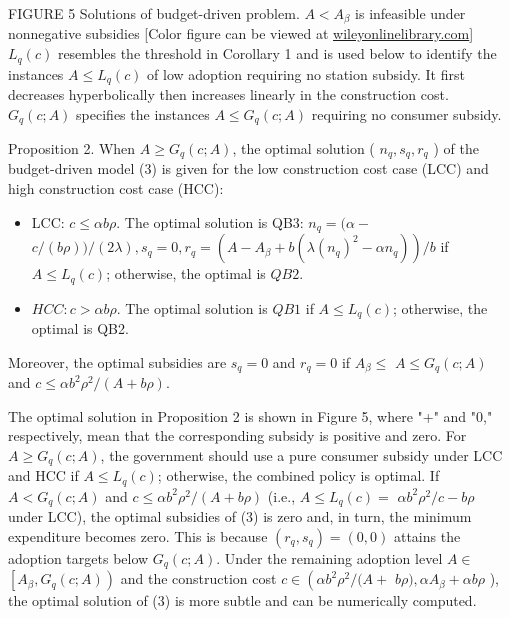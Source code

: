\documentclass[10pt]{article}
\begin{document}
FIGURE 5 Solutions of budget-driven problem. $A<A_{\beta}$ is infeasible under nonnegative subsidies [Color figure can be viewed at \href{http://wileyonlinelibrary.com}{wileyonlinelibrary.com}]\\
$L_{q}(c)$ resembles the threshold in Corollary 1 and is used below to identify the instances $A \leq L_{q}(c)$ of low adoption requiring no station subsidy. It first decreases hyperbolically then increases linearly in the construction cost. $G_{q}(c ; A)$ specifies the instances $A \leq G_{q}(c ; A)$ requiring no consumer subsidy.

Proposition 2. When $A \geq G_{q}(c ; A)$, the optimal solution ( $n_{q}, s_{q}, r_{q}$ ) of the budget-driven model (3) is given for the low construction cost case (LCC) and high construction cost case (HCC):

\begin{itemize}
  \item LCC: $c \leq \alpha b \rho$. The optimal solution is QB3: $n_{q}=(\alpha-$ $c /(b \rho)) /(2 \lambda), s_{q}=0, r_{q}=\left(A-A_{\beta}+b\left(\lambda\left(n_{q}\right)^{2}-\alpha n_{q}\right)\right) / b$ if $A \leq L_{q}(c)$; otherwise, the optimal is $Q B 2$.
  \item $H C C: c>\alpha b \rho$. The optimal solution is $Q B 1$ if $A \leq L_{q}(c)$; otherwise, the optimal is QB2.
\end{itemize}

Moreover, the optimal subsidies are $s_{q}=0$ and $r_{q}=0$ if $A_{\beta} \leq$ $A \leq G_{q}(c ; A)$ and $c \leq \alpha b^{2} \rho^{2} /(A+b \rho)$.

The optimal solution in Proposition 2 is shown in Figure 5, where "+" and "0," respectively, mean that the corresponding subsidy is positive and zero. For $A \geq G_{q}(c ; A)$, the government should use a pure consumer subsidy under LCC and HCC if $A \leq L_{q}(c)$; otherwise, the combined policy is optimal. If $A<G_{q}(c ; A)$ and $c \leq \alpha b^{2} \rho^{2} /(A+b \rho)$ (i.e., $A \leq L_{q}(c)=$ $\alpha b^{2} \rho^{2} / c-b \rho$ under LCC), the optimal subsidies of (3) is zero and, in turn, the minimum expenditure becomes zero. This is because $\left(r_{q}, s_{q}\right)=(0,0)$ attains the adoption targets below $G_{q}(c ; A)$. Under the remaining adoption level $A \in$ $\left[A_{\beta}, G_{q}(c ; A)\right)$ and the construction cost $c \in\left(\alpha b^{2} \rho^{2} /(A+\right.$ $b \rho), \alpha A_{\beta}+\alpha b \rho$ ), the optimal solution of (3) is more subtle and can be numerically computed.
\end{document}
